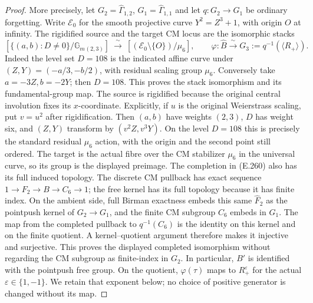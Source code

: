 \begin{proof}
More precisely, let $G_2=\widehat\Gamma_{1,2}$,
$G_1=\widehat\Gamma_{1,1}$ and let $q:G_2\to G_1$ be
ordinary forgetting.  Write $\mathcal E_0$ for the smooth
projective curve $Y^2=Z^3+1$, with origin $O$ at infinity.
The rigidified source and the target
CM locus are the isomorphic stacks
\[
 \left[\{(a,b):D\ne0\}/\mathbb G_m{}_{(2,3)}\right]
 \ \xrightarrow{\ \sim\ }\
 [(\mathcal E_0\setminus\{O\})/\mu_6],
 \qquad
 \varphi:\widehat B\xrightarrow{\ \sim\ }
 G_3:=q^{-1}(\langle R_+\rangle).
                                                               \tag{E.260}
\]
Indeed the level set $D=108$ is the indicated affine curve
under $(Z,Y)=(-a/3,-b/2)$, with
residual scaling group $\mu_6$.  Conversely take
$a=-3Z,b=-2Y$; then $D=108$.  This proves the stack
isomorphism and its fundamental-group map.
The source is rigidified because the original central
involution fixes its $x$-coordinate.  Explicitly, if $u$
is the original Weierstrass scaling, put $v=u^2$ after
rigidification.  Then $(a,b)$ have weights $(2,3)$,
$D$ has weight six, and $(Z,Y)$ transform by
$(v^2Z,v^3Y)$.  On the level $D=108$ this is precisely
the standard residual $\mu_6$ action, with the origin
and the second point still ordered.  The target is the
actual fibre over the CM stabilizer $\mu_6$ in the
universal curve, so its group is the displayed preimage.
The completion in (E.260) also has its full induced
topology.  The discrete CM pullback has exact sequence
$1\to F_2\to B\to C_6\to1$; the free kernel has its
full topology because it has finite index.  On the
ambient side, full Birman exactness embeds this same
$\widehat F_2$ as the pointpush kernel of
$G_2\to G_1$, and the finite CM subgroup $C_6$ embeds
in $G_1$.  The map from the completed pullback to
$q^{-1}(C_6)$ is the identity on this kernel and on
the finite quotient.  A kernel--quotient argument
therefore makes it injective and surjective.  This
proves the displayed completed isomorphism without
regarding the CM subgroup as finite-index in $G_2$.
In particular, $B'$ is identified with the pointpush
free group.  On the quotient, $\varphi(\tau)$ maps to
$R_+^{\varepsilon}$ for the actual
$\varepsilon\in\{1,-1\}$.
We retain that exponent below; no choice of positive
generator is changed without its map.


\end{proof}
